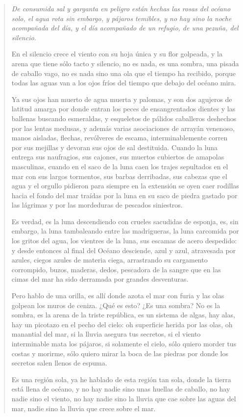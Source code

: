 \documentclass[12pt]{article}
\begin{document}
\clearpage
{}
\begin{verse}
\itshape
De consumida sal y garganta en peligro
están hechas las rosas del océano solo,
el agua rota sin embargo,
y pájaros temibles,
y no hay sino la noche acompañada
del día, y el día acompañado
de un refugio, de una
pezuña, del silencio.

En el silencio crece el viento
con su hoja única y su flor golpeada,
y la arena que tiene sólo tacto y silencio,
no es nada, es una sombra,
una pisada de caballo vago,
no es nada sino una ola que el tiempo ha recibido,
porque todas las aguas van a los ojos fríos
del tiempo que debajo del océano mira.

Ya sus ojos han muerto de agua muerta y palomas,
y son dos agujeros de latitud amarga
por donde entran los peces de ensangrentados dientes
y las ballenas buscando esmeraldas,
y esqueletos de pálidos caballeros deshechos
por las lentas medusas, y además
varias asociaciones de arrayán venenoso,
manos aisladas, flechas,
revólveres de escama,
interminablemente corren por sus mejillas
y devoran sus ojos de sal destituida.
Cuando la luna entrega sus naufragios,
sus cajones, sus muertos
cubiertos de amapolas masculinas,
cuando en el saco de la luna caen
los trajes sepultados en el mar
con sus largos tormentos, sus barbas derribadas,
sus cabezas que el agua y el orgullo pidieron para siempre
en la extensión se oyen caer rodillas
hacia el fondo del mar traídas por la luna
en su saco de piedra gastado por las lágrimas
y por las mordeduras de pescados siniestros.

Es verdad, es la luna descendiendo
con crueles sacudidas de esponja, es, sin embargo,
la luna tambaleando entre las madrigueras,
la luna carcomida por los gritos del agua,
los vientres de la luna, sus escamas
de acero despedido: y desde entonces
al final del Océano desciende,
azul y azul, atravesada por azules,
ciegos azules de materia ciega,
arrastrando su cargamento corrompido,
buzos, maderas, dedos,
pescadora de la sangre que en las cimas del mar
ha sido derramada por grandes desventuras.

Pero hablo de una orilla, es allí donde azota
el mar con furia y las olas golpean
los muros de ceniza. ¿Qué es esto? ¿Es una sombra?
No es la sombra, es la arena de la triste república,
es un sistema de algas, hay alas, hay
un picotazo en el pecho del cielo:
oh superficie herida por las olas,
oh manantial del mar,
si la lluvia asegura tus secretos, si el viento interminable
mata los pájaros, si solamente el cielo,
sólo quiero morder tus costas y morirme,
sólo quiero mirar la boca de las piedras
por donde los secretos salen llenos de espuma.

Es una región sola, ya he hablado
de esta región tan sola,
donde la tierra está llena de océano,
y no hay nadie sino unas huellas de caballo,
no hay nadie sino el viento, no hay nadie
sino la lluvia que cae sobre las aguas del mar,
nadie sino la lluvia que crece sobre el mar.

\end{verse}
\end{document}
